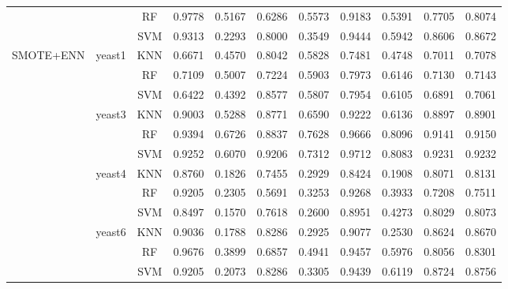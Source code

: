 \documentclass[sigconf]{acmart}
\begin{document}
\begin{table}[t]
\begin{tabular}{llccccccccc}
    & & RF & 0.9778 & 0.5167 & 0.6286 & 0.5573 & 0.9183 & 0.5391 & 0.7705 & 0.8074 \\
    & & SVM & 0.9313 & 0.2293 & 0.8000 & 0.3549 & 0.9444 & 0.5942 & 0.8606 & 0.8672 \\
    \midrule
    \multirow{12}{*}{SMOTE+ENN} & \multirow{3}{*}{yeast1} & KNN & 0.6671 & 0.4570 & 0.8042 & 0.5828 & 0.7481 & 0.4748 & 0.7011 & 0.7078 \\
    & & RF & 0.7109 & 0.5007 & 0.7224 & 0.5903 & 0.7973 & 0.6146 & 0.7130 & 0.7143 \\
    & & SVM & 0.6422 & 0.4392 & 0.8577 & 0.5807 & 0.7954 & 0.6105 & 0.6891 & 0.7061 \\
    \cmidrule{2-11}
    & \multirow{3}{*}{yeast3} & KNN & 0.9003 & 0.5288 & 0.8771 & 0.6590 & 0.9222 & 0.6136 & 0.8897 & 0.8901 \\
    & & RF & 0.9394 & 0.6726 & 0.8837 & 0.7628 & 0.9666 & 0.8096 & 0.9141 & 0.9150 \\
    & & SVM & 0.9252 & 0.6070 & 0.9206 & 0.7312 & 0.9712 & 0.8083 & 0.9231 & 0.9232 \\
    \cmidrule{2-11}
    & \multirow{3}{*}{yeast4} & KNN & 0.8760 & 0.1826 & 0.7455 & 0.2929 & 0.8424 & 0.1908 & 0.8071 & 0.8131 \\
    & & RF & 0.9205 & 0.2305 & 0.5691 & 0.3253 & 0.9268 & 0.3933 & 0.7208 & 0.7511 \\
    & & SVM & 0.8497 & 0.1570 & 0.7618 & 0.2600 & 0.8951 & 0.4273 & 0.8029 & 0.8073 \\
    \cmidrule{2-11}
    & \multirow{3}{*}{yeast6} & KNN & 0.9036 & 0.1788 & 0.8286 & 0.2925 & 0.9077 & 0.2530 & 0.8624 & 0.8670 \\
    & & RF & 0.9676 & 0.3899 & 0.6857 & 0.4941 & 0.9457 & 0.5976 & 0.8056 & 0.8301 \\
    & & SVM & 0.9205 & 0.2073 & 0.8286 & 0.3305 & 0.9439 & 0.6119 & 0.8724 & 0.8756 \\
    \bottomrule
  \end{tabular}
\end{table}
\end{document}
